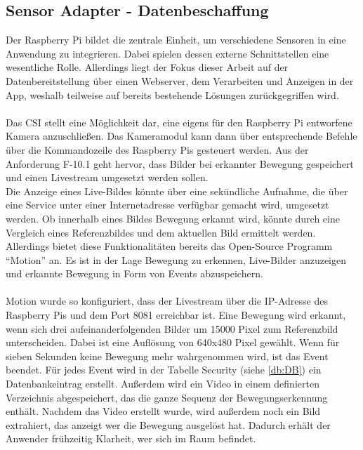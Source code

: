 \subsection{Sensor Adapter - Datenbeschaffung}
Der Raspberry Pi bildet die zentrale Einheit, um verschiedene Sensoren in eine Anwendung zu integrieren. Dabei spielen dessen externe Schnittstellen eine wesentliche Rolle. Allerdings liegt der Fokus dieser Arbeit auf der Datenbereitstellung über einen Webserver, dem Verarbeiten und Anzeigen in der App, weshalb teilweise auf bereits bestehende Lösungen zurückgegriffen wird.
\\\\Das \acf{CSI} stellt eine Möglichkeit dar, eine eigens für den Raspberry Pi entworfene Kamera anzuschließen. Das Kameramodul kann dann über entsprechende Befehle über die Kommandozeile des Raspberry Pis gesteuert werden. Aus der Anforderung F-10.1 geht hervor, dass Bilder bei erkannter Bewegung gespeichert und einen Livestream umgesetzt werden sollen.\\Die Anzeige eines Live-Bildes könnte über eine sekündliche Aufnahme, die über eine Service unter einer Internetadresse verfügbar gemacht wird, umgesetzt werden. Ob innerhalb eines Bildes Bewegung erkannt wird, könnte durch eine Vergleich eines Referenzbildes und dem aktuellen Bild ermittelt werden.\\Allerdings bietet diese Funktionalitäten bereits das Open-Source Programm \enquote{Motion} an. Es ist in der Lage Bewegung zu erkennen, Live-Bilder anzuzeigen und erkannte Bewegung in Form von Events abzuspeichern.\cite{motion:Motion}\\
\\Motion wurde so konfiguriert, dass der Livestream über die \ac{IP}-Adresse des Raspberry Pis und dem Port 8081 erreichbar ist. Eine Bewegung wird erkannt, wenn sich drei aufeinanderfolgenden Bilder um 15000 Pixel zum Referenzbild unterscheiden. Dabei ist eine Auflösung von 640x480 Pixel gewählt. Wenn für sieben Sekunden keine Bewegung mehr wahrgenommen wird, ist das Event beendet. Für jedes Event wird in der Tabelle Security (siehe \autoref{db:DB}) ein Datenbankeintrag erstellt. Außerdem wird ein Video in einem definierten Verzeichnis abgespeichert, das die ganze Sequenz der Bewegungserkennung enthält. Nachdem das Video erstellt wurde, wird außerdem noch ein Bild extrahiert, das anzeigt wer die Bewegung ausgelöst hat. Dadurch erhält der Anwender frühzeitig Klarheit, wer sich im Raum befindet.
\\\\
